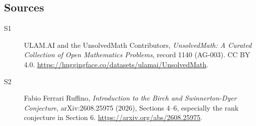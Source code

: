 \documentclass[11pt]{article}
\begin{document}
\subsection{Sources}
\begin{description}
\item[\hypertarget{source:1140:1}{S1}] ULAM.AI and the UnsolvedMath Contributors, \emph{UnsolvedMath: A Curated Collection of Open Mathematics Problems}, record 1140 (AG-003). CC BY 4.0. \url{https://huggingface.co/datasets/ulamai/UnsolvedMath}.
\item[\hypertarget{source:1140:2}{S2}] Fabio Ferrari Ruffino, \emph{Introduction to the Birch and Swinnerton-Dyer Conjecture}, arXiv:2608.25975 (2026), Sections 4--6, especially the rank conjecture in Section 6. \url{https://arxiv.org/abs/2608.25975}.
\end{description}
\label{end:1140}
\end{document}
